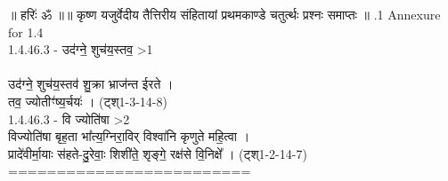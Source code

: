 \documentclass[17pt]{extarticle}
\begin{document}
॥ हरिः॑ ॐ ॥॥ कृष्ण यजुर्वेदीय तैत्तिरीय संहितायां प्रथमकाण्डे चतुर्त्थः प्रश्नः समाप्तः ॥ \newline
{}.1   Annexure for 1.4\\1.4.46.3 - उद॑ग्ने॒ शुच॑य॒स्तव॒ >1 \\\\उद॑ग्ने॒ शुच॑य॒स्तव॑ शु॒क्रा भ्राज॑न्त ईरते । \\तव॒ ज्योतीꣳ॑ष्य॒र्चयः॑ । (ट्श्1-3-14-8)\\1.4.46.3 - वि ज्योति॑षा >2 \\विज्योति॑षा बृह॒ता भा᳚त्य॒ग्निरा॒विर् विश्वा॑नि कृणुते महि॒त्वा । \\प्रादे॑वीर्मा॒याः स॑हते-दु॒रेवाः॒ शिशी॑ते॒ शृङ्गे॒ रक्ष॑से वि॒निक्षे᳚ । (ट्श्1-2-14-7)\\=========================\\
\pagebreak
        
\end{document}
